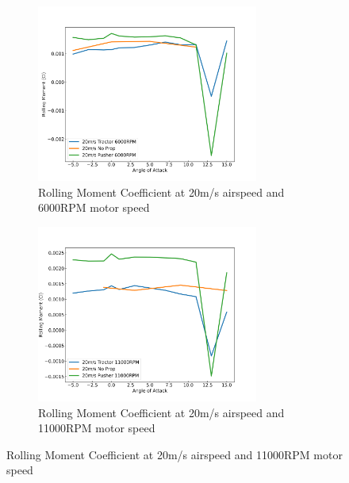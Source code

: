\begin{figure}[H]\ContinuedFloat
    \begin{subfigure}[b]{0.467\textwidth}
        \centering
        \includegraphics[width=0.8\textwidth]{05_Results/Figs/Cl_roll/20ms_6000RPM_Cl_roll.png}
        \caption{Rolling Moment Coefficient at 20m/s airspeed and 6000RPM motor speed}
        \label{fig:Cl_roll_20ms_6000}
    \end{subfigure}
    \begin{subfigure}[b]{0.467\textwidth}
        \centering
        \includegraphics[width=0.8\textwidth]{05_Results/Figs/Cl_roll/20ms_11000RPM_Cl.png}
        \caption{Rolling Moment Coefficient at 20m/s airspeed and 11000RPM motor speed}
        \label{fig:Cl_roll_20ms_11000}
    \end{subfigure}
\end{figure}


